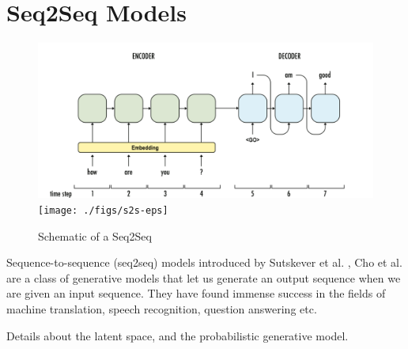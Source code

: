 \section{Seq2Seq Models}\label{background:s2s}
\begin{figure}
	\begin{minipage}[t]{\textwidth}
		\ifpdf
		\includegraphics[width=\linewidth,keepaspectratio=true]{./figs/s2s-pdf}
		\else
		\texttt{[image: ./figs/s2s-eps]}
		\fi
		\caption{\small Schematic of a Seq2Seq \cite{s2s}}
		\label{bck:s2s}
	\end{minipage}
\end{figure}

Sequence-to-sequence (seq2seq) models introduced by Sutskever et al. , Cho et al. are a class of generative models that let us generate an output sequence when we are given an input sequence. They have found immense success in the fields of machine translation, speech recognition, question answering etc. 

Details about the latent space, and the probabilistic generative model.